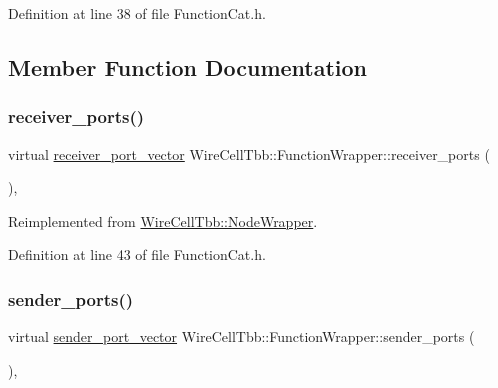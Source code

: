 Definition at line 38 of file Function\+Cat.\+h.



\subsection{Member Function Documentation}
\mbox{\label{class_wire_cell_tbb_1_1_function_wrapper_a7d856ca70ebeb8947ce18c1a711f60ac}} 
\subsubsection{\texorpdfstring{receiver\+\_\+ports()}{receiver\_ports()}}
{\footnotesize\ttfamily virtual \hyperlink{namespace_wire_cell_tbb_a87f42fe8a3ccc3bf9d315cb2d252c7af}{receiver\+\_\+port\+\_\+vector} Wire\+Cell\+Tbb\+::\+Function\+Wrapper\+::receiver\+\_\+ports (\begin{DoxyParamCaption}{ }\end{DoxyParamCaption})\hspace{0.3cm}{\ttfamily [inline]}, {\ttfamily [virtual]}}



Reimplemented from \hyperlink{class_wire_cell_tbb_1_1_node_wrapper_ac3c636904e4d3d1df0939906dd8853c7}{Wire\+Cell\+Tbb\+::\+Node\+Wrapper}.



Definition at line 43 of file Function\+Cat.\+h.

\mbox{\label{class_wire_cell_tbb_1_1_function_wrapper_a8b573eef2825b3f7920f7f358ddf914c}} 
\subsubsection{\texorpdfstring{sender\+\_\+ports()}{sender\_ports()}}
{\footnotesize\ttfamily virtual \hyperlink{namespace_wire_cell_tbb_a99272fef0f0c33dc9d4e6e8f777b2e6e}{sender\+\_\+port\+\_\+vector} Wire\+Cell\+Tbb\+::\+Function\+Wrapper\+::sender\+\_\+ports (\begin{DoxyParamCaption}{ }\end{DoxyParamCaption})\hspace{0.3cm}{\ttfamily [inline]}, {\ttfamily [virtual]}}



